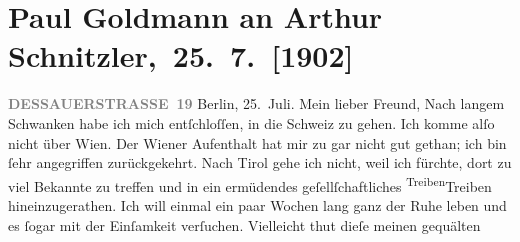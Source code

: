 

         
         \renewcommand{\erwaehntePersonen}{Personen: Otto Brahm, Raphael Löwenfeld, Walther Rathenau, Olga Schnitzler, Elisabeth Steinrück}
         \renewcommand{\erwaehnteInstitutionen}{Institutionen: S. Hirzel Verlag (Leipzig), Schiller-Theater}
         \renewcommand{\erwaehnteOrte}{Orte: Berlin, Dessauer Straße, Kaltenleutgeben, Leipzig, Schweiz, Südtirol, Tirol, Wien}
         \renewcommand{\erwaehnteWerke}{Werke: Der Schleier der Beatrice. Schauspiel in fünf Akten, Impressionen}
               \section[ Paul Goldmann an Arthur Schnitzler, 25. 7. {[}1902{]}]{ Paul Goldmann an Arthur Schnitzler, 25. 7. {[}1902{]}}\nopagebreak{}\rehead{ }\begin{ledgroupsized}[t]{13cm}\normalsize\beginnumbering \toendnotes[C]{\smallbreak\pagebreak[2]} 
\toendnotes[C]{\smallbreak}\pstart
           \noindent{}\raggedleft{}{\pb}\textcolor{gray}{\textbf{DESSAUERSTRASSE 19}}\pend
           \pstart
           Berlin, 25. Juli.\pend
           \pstart\center{}Mein lieber Freund,\pend\pstart
           Nach langem Schwanken habe ich mich entſchloſſen, in die Schweiz zu gehen. Ich komme alſo nicht über Wien. Der Wiener Aufenthalt
               hat mir zu \label{K_L03214-1v}\label{K_L03214-1h} gar nicht gut gethan; ich  bin ſehr
               angegriffen zurückgekehrt. Nach Tirol
               gehe ich nicht, weil ich fürchte, dort zu viel Bekannte zu treffen und in ein
               ermüdendes geſellſchaftliches {\pb}\substVorne{}\textsuperscript{Treiben}{\allowbreak}\substDazwischen{}Treiben\substHinten{} hineinzugerathen. Ich will einmal ein paar Wochen lang ganz der Ruhe leben
               und es ſogar mit der Einſamkeit verſuchen. Vielleicht thut dieſe meinen gequälten

\end{ledgroupsized}
